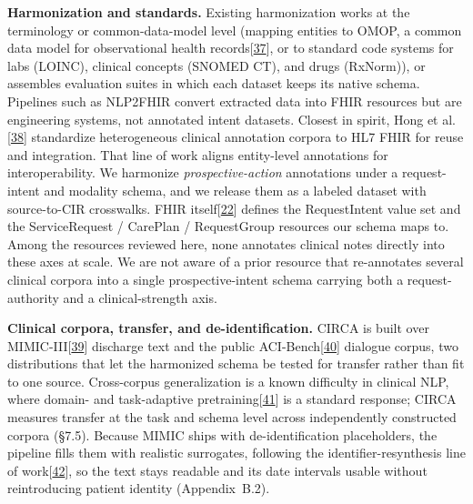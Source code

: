 \documentclass[3p,twocolumn]{elsarticle}
\begin{document}
\textbf{Harmonization and standards.} Existing harmonization works at the terminology or common-data-model level (mapping entities to OMOP, a common data model for observational health records{[}\hyperref[r37]{37}{]}, or to standard code systems for labs (LOINC), clinical concepts (SNOMED CT), and drugs (RxNorm)), or assembles evaluation suites in which each dataset keeps its native schema. Pipelines such as NLP2FHIR convert extracted data into FHIR resources but are engineering systems, not annotated intent datasets. Closest in spirit, Hong et al.{[}\hyperref[r38]{38}{]} standardize heterogeneous clinical annotation corpora to HL7 FHIR for reuse and integration. That line of work aligns entity-level annotations for interoperability. We harmonize \emph{prospective-action} annotations under a request-intent and modality schema, and we release them as a labeled dataset with source-to-CIR crosswalks. FHIR itself{[}\hyperref[r22]{22}{]} defines the RequestIntent value set and the ServiceRequest / CarePlan / RequestGroup resources our schema maps to. Among the resources reviewed here, none annotates clinical notes directly into these axes at scale. We are not aware of a prior resource that re-annotates several clinical corpora into a single prospective-intent schema carrying both a request-authority and a clinical-strength axis.

\textbf{Clinical corpora, transfer, and de-identification.} CIRCA is built over MIMIC-III{[}\hyperref[r39]{39}{]} discharge text and the public ACI-Bench{[}\hyperref[r40]{40}{]} dialogue corpus, two distributions that let the harmonized schema be tested for transfer rather than fit to one source. Cross-corpus generalization is a known difficulty in clinical NLP, where domain- and task-adaptive pretraining{[}\hyperref[r41]{41}{]} is a standard response; CIRCA measures transfer at the task and schema level across independently constructed corpora (§7.5). Because MIMIC ships with de-identification placeholders, the pipeline fills them with realistic surrogates, following the identifier-resynthesis line of work{[}\hyperref[r42]{42}{]}, so the text stays readable and its date intervals usable without reintroducing patient identity (Appendix~B.2).
\end{document}
